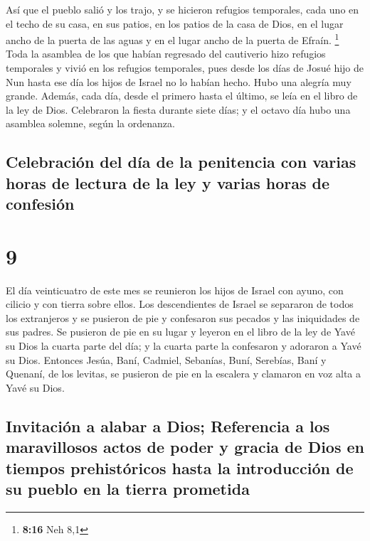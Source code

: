  Así que el pueblo salió y los trajo, y se hicieron
refugios temporales, cada uno en el techo de su casa, en sus patios, en
los patios de la casa de Dios, en el lugar ancho de la puerta de las
aguas y en el lugar ancho de la puerta de Efraín. \footnote{\textbf{8:16}
  Neh 8,1}  Toda la asamblea de los que habían regresado
del cautiverio hizo refugios temporales y vivió en los refugios
temporales, pues desde los días de Josué hijo de Nun hasta ese día los
hijos de Israel no lo habían hecho. Hubo una alegría muy grande.
 Además, cada día, desde el primero hasta el último, se
leía en el libro de la ley de Dios. Celebraron la fiesta durante siete
días; y el octavo día hubo una asamblea solemne, según la ordenanza.

\hypertarget{celebraciuxf3n-del-duxeda-de-la-penitencia-con-varias-horas-de-lectura-de-la-ley-y-varias-horas-de-confesiuxf3n}{%
\subsection{Celebración del día de la penitencia con varias horas de
lectura de la ley y varias horas de
confesión}\label{celebraciuxf3n-del-duxeda-de-la-penitencia-con-varias-horas-de-lectura-de-la-ley-y-varias-horas-de-confesiuxf3n}}

\hypertarget{section-8}{%
\section{9}\label{section-8}}

 El día veinticuatro de este mes se reunieron los hijos de
Israel con ayuno, con cilicio y con tierra sobre ellos. 
Los descendientes de Israel se separaron de todos los extranjeros y se
pusieron de pie y confesaron sus pecados y las iniquidades de sus
padres.  Se pusieron de pie en su lugar y leyeron en el
libro de la ley de Yavé su Dios la cuarta parte del día; y la cuarta
parte la confesaron y adoraron a Yavé su Dios.  Entonces
Jesúa, Baní, Cadmiel, Sebanías, Buní, Serebías, Baní y Quenaní, de los
levitas, se pusieron de pie en la escalera y clamaron en voz alta a Yavé
su Dios.

\hypertarget{invitaciuxf3n-a-alabar-a-dios-referencia-a-los-maravillosos-actos-de-poder-y-gracia-de-dios-en-tiempos-prehistuxf3ricos-hasta-la-introducciuxf3n-de-su-pueblo-en-la-tierra-prometida}{%
\subsection{Invitación a alabar a Dios; Referencia a los maravillosos
actos de poder y gracia de Dios en tiempos prehistóricos hasta la
introducción de su pueblo en la tierra
prometida}\label{invitaciuxf3n-a-alabar-a-dios-referencia-a-los-maravillosos-actos-de-poder-y-gracia-de-dios-en-tiempos-prehistuxf3ricos-hasta-la-introducciuxf3n-de-su-pueblo-en-la-tierra-prometida}}

